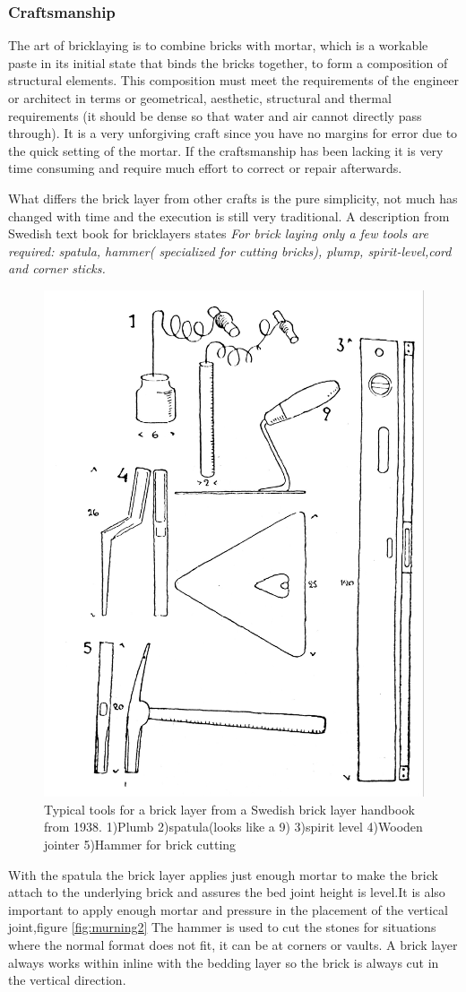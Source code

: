 \subsubsection{Craftsmanship}

The art of bricklaying is to combine  bricks with mortar, which is a workable paste in its initial state that binds the bricks together, to form a composition of structural elements. This composition must meet the requirements of the engineer or architect in terms or geometrical, aesthetic, structural and thermal requirements (it should be dense so that water and air cannot directly pass through). It is a very unforgiving craft since you have no margins for error due to the quick setting of the mortar. If the craftsmanship has been lacking it is very time consuming and require much effort to correct or repair afterwards. 

What differs the brick layer from other crafts is the pure simplicity, not much has changed with time and the execution is still very traditional. A description from Swedish text book for bricklayers states \textit{ For brick laying only a few tools are required: spatula, hammer( specialized for cutting bricks), plump, spirit-level,cord and corner sticks\cite{ref:murning}.}

\begin{figure}[H]
\centering
\includegraphics[width=0.4\linewidth ]{figure/Introduction/tools2.pdf}
\caption{Typical tools for a brick layer from a Swedish  brick layer handbook from 1938. 1)Plumb 2)spatula(looks like a 9) 3)spirit level 4)Wooden jointer 5)Hammer for brick cutting  \cite{ref:murning}}
\end{figure}

With the spatula the brick layer applies just enough mortar to make the brick attach to the underlying brick and assures the bed joint height is level.It is also important to apply enough mortar and pressure in the placement of the vertical joint,figure \ref{fig:murning2}  The hammer is used to cut the stones for situations where the normal format does not fit, it can be at corners or vaults. A brick layer always works within inline with the bedding layer so the brick is always cut in the vertical direction.

